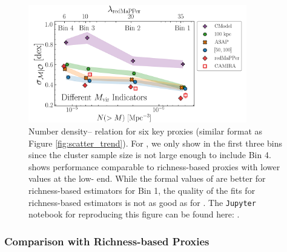 \documentclass[fleqn,usenatbib,useAMS]{mnras}
\begin{document}

\begin{figure}
    \centering
    \includegraphics[width=0.85\textwidth]{figure/fig_8}
    \caption{Number density--\sigmvir{} relation for
        six key \mvir{} proxies (similar format as Figure \ref{fig:scatter_trend}).
        For \camira{}, we only show \sigmvir{} in the first three bins since the 
        cluster sample size is not large enough to include Bin 4. 
         shows performance comparable to richness-based proxies with lower \sigmvir{}
        values at the low-\mvir{} end. 
        While the formal values of \sigmvir{} are better for richness-based estimators for Bin 1,
        the quality of the fits for richness-based estimators is not as good as for .
        The \texttt{Jupyter} notebook for reproducing this figure can be found here:
        \href{https://github.com/dr-guangtou/jianbing/blob/master/notebooks/figure/fig8.ipynb}{\faGithub}.
    }
    \label{fig:scatter_trend_2}
\end{figure}

\subsubsection{Comparison with Richness-based Proxies}
    \label{sec:richness_results}
\end{document}
